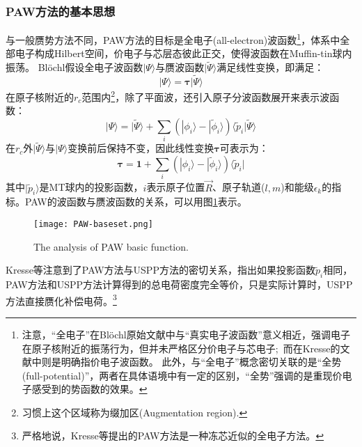 \documentclass{article}      %
\begin{document}
\subsubsection{PAW方法的基本思想}
与一般赝势方法不同，\textrm{PAW}方法的目标是全电子\textrm{(all-electron)}波函数\footnote{注意，“全电子”在\textrm{Bl\"ochl}原始文献\cite{PRB50-17953_1994}中与“真实电子波函数”意义相近，强调电子在原子核附近的振荡行为，但并未严格区分价电子与芯电子;~而在\textrm{Kresse}的文献\cite{PRB59-1758_1999}中则是明确指价电子波函数。%
此外，与“全电子”概念密切关联的是“全势(full-potential)”，两者在具体语境中有一定的区别，“全势”强调的是重现价电子感受到的势函数的效果。}，体系中全部电子构成\textrm{Hilbert}空间，价电子与芯层态彼此正交，使得波函数在\textrm{Muffin-tin}球内振荡。
\textrm{Bl\"ochl}假设全电子波函数$|\Psi\rangle$与赝波函数$|\tilde\Psi\rangle$满足线性变换，即满足：
\begin{equation}
	|\Psi\rangle=\mathbf{\tau|}\tilde\Psi\rangle
	\label{eq:PAW-Blochl-01}
\end{equation}
在原子核附近的$r_c$范围内\footnote{习惯上这个区域称为缀加区(\textrm{Augmentation region}).}，除了平面波，还引入原子分波函数展开来表示波函数：
\begin{equation}
	|\Psi\rangle=|\tilde\Psi\rangle+\sum_i(|\phi_i\rangle-|\tilde\phi_i\rangle)\langle\tilde p_i|\tilde\Psi\rangle
	\label{eq:PAW-Blochl-02}
\end{equation}
在$r_c$外$|\tilde\Psi\rangle$与$|\Psi\rangle$变换前后保持不变，因此线性变换$\mathbf{\tau}$可表示为：
\begin{equation}
	\mathbf{\tau}=\mathbf{1}+\sum_i(|\phi_i\rangle-|\tilde\phi_i\rangle)\langle\tilde p_i|
	\label{eq:PAW-Blochl-03}
\end{equation}
其中$|\tilde p_i\rangle$是\textrm{MT}球内的投影函数，$i$表示原子位置$\vec R$、原子轨道($l,m$)和能级$\epsilon_k$的指标。\textrm{PAW}的波函数与赝波函数的关系，可以用图\ref{PAW_basic}表示。
\begin{figure}[h!]
\centering
\texttt{[image: PAW-baseset.png]}
\caption{\small \textrm{The analysis of PAW basic function.}}%
\label{PAW_basic}
\end{figure}

\textrm{Kresse}等注意到了\textrm{PAW}方法与\textrm{USPP}方法的密切关系，指出如果投影函数$\tilde p_i$相同，\textrm{PAW}方法和\textrm{USPP}方法计算得到的总电荷密度完全等价，只是实际计算时，\textrm{USPP}方法直接赝化补偿电荷。\footnote{严格地说，\textrm{Kresse}等提出的\textrm{PAW}方法是一种冻芯近似的全电子方法。}
\end{document}
